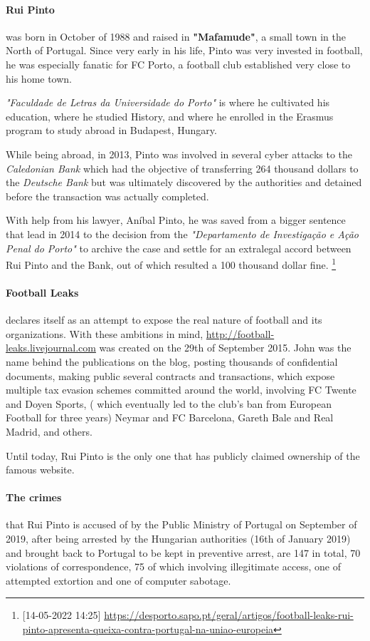 \paragraph{Rui Pinto}
was born in October of 1988 and raised in \textbf{"Mafamude"}, a small town in the North of Portugal.
Since very early in his life, Pinto was very invested in football, he was especially fanatic for FC Porto, a football club established very close to his home town.

\textit{"Faculdade de Letras da Universidade do Porto"} is where he cultivated his education, where he studied History, and where he enrolled in the Erasmus program to study abroad in Budapest, Hungary.

While being abroad, in 2013, Pinto was involved in several cyber attacks to the \textit{Caledonian Bank} which had the objective of transferring 264 thousand dollars to the \textit{Deutsche Bank} but was ultimately discovered by the authorities and detained before the transaction was actually completed.

With help from his lawyer, Aníbal Pinto, he was saved from a bigger sentence that lead in 2014 to the decision from the \textit{"Departamento de Investigação e Ação Penal do Porto"} to archive the case and settle for an extralegal accord between Rui Pinto and the Bank, out of which resulted a 100 thousand dollar fine.
\footnote{[14-05-2022 14:25] \url{https://desporto.sapo.pt/geral/artigos/football-leaks-rui-pinto-apresenta-queixa-contra-portugal-na-uniao-europeia}}


\paragraph{Football Leaks} declares itself as an attempt to expose the real nature of football and its organizations.
With these ambitions in mind, \url{http://football-leaks.livejournal.com} was created on the 29th of September 2015.
John was the name behind the publications on the blog, posting thousands of confidential documents, making public several contracts and transactions, which expose multiple tax evasion schemes committed around the world, involving FC Twente and Doyen Sports, ( which eventually led to the club's ban from European Football for three years) Neymar and FC Barcelona, Gareth Bale and Real Madrid, and others.

Until today, Rui Pinto is the only one that has publicly claimed ownership of the famous website.

\paragraph{The crimes} that Rui Pinto is accused of by the Public Ministry of Portugal on September of 2019, after being arrested by the Hungarian authorities (16th of January 2019) and brought back to Portugal to be kept in preventive arrest, are 147 in total, 70 violations of correspondence, 75 of which involving illegitimate access, one of attempted extortion and one of computer sabotage.

